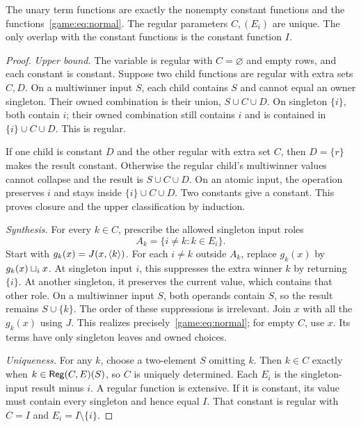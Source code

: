 \begin{proposition}\label{game:thm:unary}
The unary term functions are exactly the nonempty constant functions and
the functions~\eqref{game:eq:normal}. The regular parameters $C,(E_i)$ are
unique. The only overlap with the constant functions is the constant
function $I$.
\end{proposition}
\begin{proof}
\emph{Upper bound.} The variable is regular with $C=\varnothing$ and
empty rows, and each constant is constant. Suppose two child functions
are regular with extra sets $C,D$. On a multiwinner input $S$, each child
contains $S$ and cannot equal an owner singleton. Their owned combination
is their union, $S\cup C\cup D$. On singleton $\{i\}$, both contain $i$;
their owned combination still contains $i$ and is contained in
$\{i\}\cup C\cup D$. This is regular.

If one child is constant $D$ and the other regular with extra set $C$,
then $D=\{r\}$ makes the result constant. Otherwise the regular child's
multiwinner values cannot collapse and the result is $S\cup C\cup D$.
On an atomic input, the operation preserves $i$ and stays inside
$\{i\}\cup C\cup D$. Two constants give a constant. This proves closure
and the upper classification by induction.

\emph{Synthesis.} For every $k\in C$, prescribe the allowed singleton
input roles
\[
 A_k=\{i\ne k:k\in E_i\}.
\]
Start with $g_k(x)=J(x,\langle k\rangle)$. For each $i\ne k$ outside $A_k$, replace
$g_k(x)$ by $g_k(x)\mathbin{\sqcup_{i}} x$. At singleton input $i$, this suppresses the
extra winner $k$ by returning $\{i\}$. At another singleton, it preserves
the current value, which contains that other role. On a multiwinner
input $S$, both operands contain $S$, so the result remains $S\cup\{k\}$.
The order of these suppressions is irrelevant. Join $x$ with all the
$g_k(x)$ using $J$. This realizes precisely~\eqref{game:eq:normal}; for empty
$C$, use $x$. Its terms have only
singleton leaves and owned choices.

\emph{Uniqueness.} For any $k$, choose a two-element $S$ omitting $k$.
Then $k\in C$ exactly when $k\in\mathsf{Reg}(C,E)(S)$, so $C$ is uniquely
determined. Each $E_i$ is the singleton-input result minus $i$. A regular
function is extensive. If it is constant, its value must contain every
singleton and hence equal $I$. That constant is regular with $C=I$ and
$E_i=I\setminus\{i\}$.
\end{proof}

